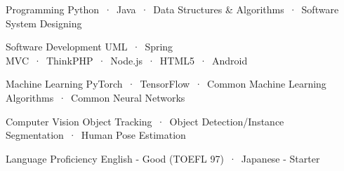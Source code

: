 

\begin{cvskills}
  \cvskill
    {Programming} %
    {Python\ ·\ Java\ ·\ Data Structures \& Algorithms\ ·\ Software System Designing} %
    
  \cvskill
    {Software Development} %
    {UML\ ·\ Spring MVC\ ·\ ThinkPHP\ ·\ Node.js\ ·\ HTML5\ ·\ Android} %

  \cvskill
    {Machine Learning} %
    {PyTorch\ ·\ TensorFlow\ ·\ Common Machine Learning Algorithms\ ·\ Common Neural Networks} %
    
  \cvskill
    {Computer Vision} %
    {Object Tracking\ ·\ Object Detection/Instance Segmentation\ ·\ Human Pose Estimation} %
    
  \cvskill
    {Language Proficiency} %
    {English - Good (TOEFL 97)\ ·\ Japanese - Starter} %
  



\end{cvskills}
